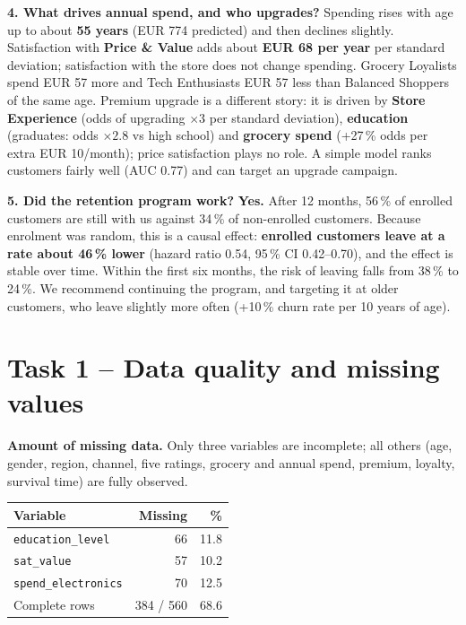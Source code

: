 \documentclass[10pt,a4paper]{article}
\begin{document}
\textbf{4. What drives annual spend, and who upgrades?} Spending rises with age up to about \textbf{55 years} (EUR 774 predicted) and then declines slightly. Satisfaction with \textbf{Price \& Value} adds about \textbf{EUR 68 per year} per standard deviation; satisfaction with the store does not change spending. Grocery Loyalists spend EUR 57 more and Tech Enthusiasts EUR 57 less than Balanced Shoppers of the same age. Premium upgrade is a different story: it is driven by \textbf{Store Experience} (odds of upgrading $\times 3$ per standard deviation), \textbf{education} (graduates: odds $\times 2.8$ vs high school) and \textbf{grocery spend} (+27\,\% odds per extra EUR 10/month); price satisfaction plays no role. A simple model ranks customers fairly well (AUC 0.77) and can target an upgrade campaign.

\textbf{5. Did the retention program work?} \textbf{Yes.} After 12 months, 56\,\% of enrolled customers are still with us against 34\,\% of non-enrolled customers. Because enrolment was random, this is a causal effect: \textbf{enrolled customers leave at a rate about 46\,\% lower} (hazard ratio 0.54, 95\,\% CI 0.42--0.70), and the effect is stable over time. Within the first six months, the risk of leaving falls from 38\,\% to 24\,\%. We recommend continuing the program, and targeting it at older customers, who leave slightly more often (+10\,\% churn rate per 10 years of age).

\newpage

\section{Task 1 -- Data quality and missing values}

\textbf{Amount of missing data.} Only three variables are incomplete; all others (age, gender, region, channel, five ratings, grocery and annual spend, premium, loyalty, survival time) are fully observed.

\begin{table}[H]
\centering
\begin{tabular}{lrr}
\toprule
Variable & Missing & \% \\
\midrule
\texttt{education\_level}   & 66        & 11.8 \\
\texttt{sat\_value}         & 57        & 10.2 \\
\texttt{spend\_electronics} & 70        & 12.5 \\
Complete rows               & 384 / 560 & 68.6 \\
\bottomrule
\end{tabular}
\end{table}
\end{document}
